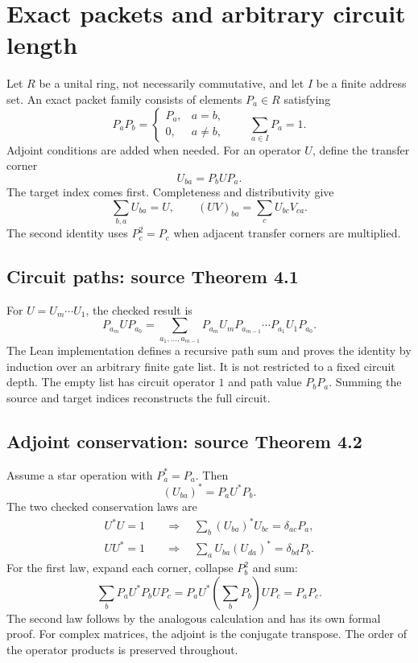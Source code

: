 \section{Exact packets and arbitrary circuit length}\label{supp1:section:001}
Let $R$ be a unital ring, not necessarily commutative, and let $I$ be a finite address set. An exact packet family consists of elements $P_a\in R$ satisfying
\[
P_aP_b=\begin{cases}P_a,&a=b,\\0,&a\ne b,\end{cases}
\qquad \sum_{a\in I}P_a=1.
\]
Adjoint conditions are added when needed. For an operator $U$, define the transfer corner
\[
U_{ba}=P_bUP_a.
\]
The target index comes first. Completeness and distributivity give
\[
\sum_{b,a}U_{ba}=U,\qquad
(UV)_{ba}=\sum_c U_{bc}V_{ca}.
\]
The second identity uses $P_c^2=P_c$ when adjacent transfer corners are multiplied.

\subsection{Circuit paths: source Theorem 4.1}
For $U=U_m\cdots U_1$, the checked result is
\[
P_{a_m}UP_{a_0}
=\sum_{a_1,\ldots,a_{m-1}}
P_{a_m}U_mP_{a_{m-1}}\cdots P_{a_1}U_1P_{a_0}.
\]
The Lean implementation defines a recursive path sum and proves the identity by induction over an arbitrary finite gate list. It is not restricted to a fixed circuit depth. The empty list has circuit operator $1$ and path value $P_bP_a$. Summing the source and target indices reconstructs the full circuit.



\subsection{Adjoint conservation: source Theorem 4.2}
Assume a star operation with $P_a^*=P_a$. Then
\[
(U_{ba})^*=P_aU^*P_b.
\]
The two checked conservation laws are
\begin{align*}
U^*U=1&\quad\Longrightarrow\quad
\sum_b(U_{ba})^*U_{bc}=\delta_{ac}P_a,\\
UU^*=1&\quad\Longrightarrow\quad
\sum_aU_{ba}(U_{da})^*=\delta_{bd}P_b.
\end{align*}
For the first law, expand each corner, collapse $P_b^2$ and sum:
\[
\sum_bP_aU^*P_bUP_c
=P_aU^*\left(\sum_bP_b\right)UP_c=P_aP_c.
\]
The second law follows by the analogous calculation and has its own formal proof. For complex matrices, the adjoint is the conjugate transpose. The order of the operator products is preserved throughout.





